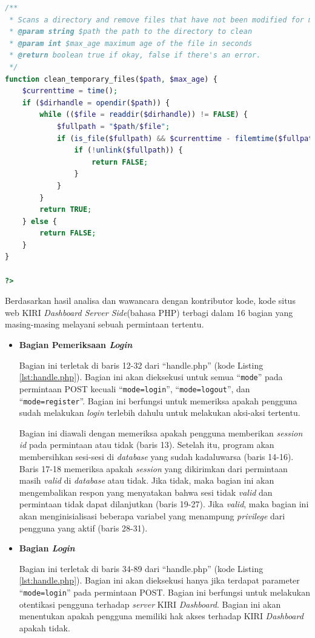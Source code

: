 \documentclass[a4paper,twoside]{article}
\begin{document}
\begin{enumerate}
\begin{lstlisting}[language=PHP,basicstyle=\tiny,caption=handle.php,label={lst:handle.php}]
/**
 * Scans a directory and remove files that have not been modified for max_age
 * @param string $path the path to the directory to clean 
 * @param int $max_age maximum age of the file in seconds
 * @return boolean true if okay, false if there's an error.
 */
function clean_temporary_files($path, $max_age) {
	$currenttime = time();
	if ($dirhandle = opendir($path)) {
		while (($file = readdir($dirhandle)) != FALSE) {
			$fullpath = "$path/$file";
			if (is_file($fullpath) && $currenttime - filemtime($fullpath) > $max_age) {
				if (!unlink($fullpath)) {
					return FALSE;
				}
			}
		}
		return TRUE;
	} else {
		return FALSE;
	}
}

?>
\end{lstlisting}

		Berdasarkan hasil analisa dan wawancara dengan kontributor kode, kode situs web KIRI \textit{Dashboard Server Side}(bahasa PHP) terbagi dalam 16 bagian yang masing-masing melayani sebuah permintaan tertentu.

\begin{itemize}
\item \textbf{Bagian Pemeriksaan \textit{Login}}

Bagian ini terletak di baris 12-32 dari ``handle.php'' (kode Listing \ref{lst:handle.php}). Bagian ini akan dieksekusi untuk semua ``\texttt{mode}'' pada permintaan POST kecuali ``\texttt{mode=login}'', ``\texttt{mode=logout}'', dan ``\texttt{mode=register}''. Bagian ini berfungsi untuk memeriksa apakah pengguna sudah melakukan \textit{login} terlebih dahulu untuk melakukan aksi-aksi tertentu.

Bagian ini diawali dengan memeriksa apakah pengguna memberikan \textit{session id} pada permintaan atau tidak (baris 13). Setelah itu, program akan membersihkan sesi-sesi di \textit{database} yang sudah kadaluwarsa (baris 14-16). Baris 17-18 memeriksa apakah \textit{session} yang dikirimkan dari permintaan masih \textit{valid} di \textit{database} atau tidak. Jika tidak, maka bagian ini akan mengembalikan respon yang menyatakan bahwa sesi tidak \textit{valid} dan permintaan tidak dapat dilanjutkan (baris 19-27). Jika \textit{valid}, maka bagian ini akan menginisialisasi beberapa variabel yang menampung \textit{privilege} dari pengguna yang aktif (baris 28-31).

\item \textbf{Bagian \textit{Login}}

Bagian ini terletak di baris 34-89 dari ``handle.php'' (kode Listing \ref{lst:handle.php}). Bagian ini akan dieksekusi hanya jika terdapat parameter ``\texttt{mode=login}'' pada permintaan POST. Bagian ini berfungsi untuk melakukan otentikasi pengguna terhadap \textit{server} KIRI \textit{Dashboard}. Bagian ini akan menentukan apakah pengguna memiliki hak akses terhadap KIRI \textit{Dashboard} apakah tidak.


\end{itemize}
\end{enumerate}
\end{document}
